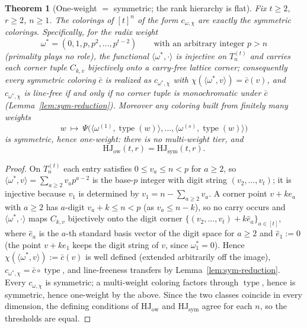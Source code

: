 \documentclass[10pt,a4paper]{amsart}
\newtheorem{theorem}{Theorem}
\newcommand{\HJ}{\mathrm{HJ}}
\renewcommand{\ge}{\geqslant}
\renewcommand{\le}{\leqslant}
\DeclareMathOperator{\type}{type}
\begin{document}
\begin{theorem}[{One-weight $=$ symmetric; the rank hierarchy is flat}]\label{thm:radix}
Fix $t\ge 2$, $r\ge 2$, $n\ge 1$. The colorings of $[t]^{n}$ of the
form $c_{\omega,\chi}$ are exactly the symmetric colorings.
Specifically, for the \emph{radix weight}
\[
\omega^{\ast}=(0,1,p,p^{2},\dots,p^{t-2})
\qquad\text{with an arbitrary integer } p>n
\]
\textup{(}primality plays no role\textup{)}, the functional
$\langle\omega^{\ast},\cdot\rangle$ is injective on $T_{n}^{(t)}$ and
carries each corner tuple $C_{k,v}$ bijectively onto a carry-free
lattice corner; consequently every symmetric coloring $\bar c$ is
realized as $c_{\omega^{\ast},\chi}$ with
$\chi(\langle\omega^{\ast},v\rangle)=\bar c(v)$, and
$c_{\omega^{\ast},\chi}$ is line-free if and only if no corner tuple is
monochromatic under $\bar c$ (Lemma~\ref{lem:sym-reduction}). Moreover
any coloring built from finitely many weights
\[
w\ \longmapsto\ \Psi\bigl(\langle\omega^{(1)},\type(w)\rangle,\dots,
\langle\omega^{(s)},\type(w)\rangle\bigr)
\]
is symmetric, hence one-weight: there is no multi-weight tier, and
\[
\HJ_{\mathrm{ow}}(t,r)=\HJ_{\mathrm{sym}}(t,r).
\]
\end{theorem}

\begin{proof}
On $T_{n}^{(t)}$ each entry satisfies $0\le v_{a}\le n<p$ for $a\ge 2$,
so $\langle\omega^{\ast},v\rangle=\sum_{a\ge 2}v_{a}p^{a-2}$ is the
base-$p$ integer with digit string $(v_{2},\dots,v_{t})$; it is
injective because $v_{1}$ is determined by
$v_{1}=n-\sum_{a\ge 2}v_{a}$. A corner point $v+ke_{a}$ with $a\ge 2$
has $a$-digit $v_{a}+k\le n<p$ (as $v_{a}\le n-k$), so no carry occurs
and $\langle\omega^{\ast},\cdot\rangle$ maps $C_{k,v}$ bijectively onto
the digit corner $\{(v_{2},\dots,v_{t})+k\hat e_{a}\}_{a\in[t]}$, where
$\hat e_{a}$ is the $a$-th standard basis vector of the digit space for
$a\ge 2$ and $\hat e_{1}:=0$ (the point $v+ke_{1}$ keeps the digit
string of $v$, since $\omega^{\ast}_{1}=0$). Hence
$\chi(\langle\omega^{\ast},v\rangle):=\bar c(v)$ is well defined
(extended arbitrarily off the image),
$c_{\omega^{\ast},\chi}=\bar c\circ\type$, and line-freeness transfers
by Lemma~\ref{lem:sym-reduction}. Every $c_{\omega,\chi}$ is symmetric;
a multi-weight coloring factors through $\type$, hence is symmetric,
hence one-weight by the above. Since the two classes coincide in every
dimension, the defining conditions of $\HJ_{\mathrm{ow}}$ and
$\HJ_{\mathrm{sym}}$ agree for each $n$, so the thresholds are equal.
\end{proof}
\end{document}

